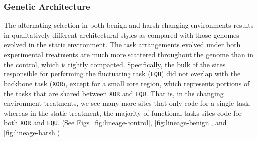 \documentclass[10pt,letterpaper,final]{article}
\begin{document}
\subsubsection*{Genetic Architecture}
The alternating selection in both benign and harsh changing environments results in qualitatively different architectural styles as compared with those genomes evolved in the static environment. The task arrangements evolved under both experimental treatments are much more scattered throughout the genome than in the control, which is tightly compacted. Specifically, the bulk of the sites responsible for performing the fluctuating task (\texttt{EQU}) did not overlap with the backbone task (\texttt{XOR}), except for a small core region, which represents portions of the tasks that are shared between \texttt{XOR} and \texttt{EQU}. That is, in the changing environment treatments, we see many more sites that only code for a single task, whereas in the static treatment, the majority of functional tasks sites code for both \texttt{XOR} and \texttt{EQU}. (See Figs~\ref{fig:lineage-control}, \ref{fig:lineage-benign}, and \ref{fig:lineage-harsh})
\end{document}
